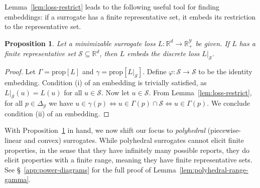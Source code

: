 \documentclass[11pt]{article}
\newcommand{\reals}{\mathbb{R}}
\newcommand{\prop}[1]{\mathrm{prop}[#1]}
\newcommand{\simplex}{\Delta_\Y}
\newcommand{\Sc}{\mathcal{S}}
\newcommand{\Y}{\mathcal{Y}}
\newtheorem{proposition}{Proposition}
\begin{document}
Lemma~\ref{lem:loss-restrict} leads to the following useful tool for finding embeddings: if a surrogate has a finite representative set, it embeds its restriction to the representative set.
\begin{proposition}\label{prop:representative-embeds-restriction}
  Let a minimizable surrogate loss $L:\reals^d \to \reals^\Y_+$ be given.
  If $L$ has a finite representative set $\Sc \subseteq \reals^d$, then $L$ embeds the discrete loss $L|_\Sc$.
\end{proposition}
\begin{proof}
  Let $\Gamma = \prop{L}$ and $\gamma = \prop{L|_\Sc}$.
  Define $\varphi : \Sc \to \Sc$ to be the identity embedding.
  Condition (i) of an embedding is trivially satisfied, as $L|_\Sc(u) = L(u)$ for all $u\in\Sc$.
  Now let $u\in\Sc$.
  From Lemma~\ref{lem:loss-restrict}, for all $p\in\simplex$ we have $u \in \gamma(p) \iff u \in \Gamma(p) \cap \Sc \iff u \in \Gamma(p)$.
  We conclude condition (ii) of an embedding.
\end{proof}


With Proposition~\ref{prop:representative-embeds-restriction} in hand, we now shift our focus to \emph{polyhedral} (piecewise-linear and convex) surrogates.
While polyhedral surrogates cannot elicit finite properties, in the sense that they have infinitely many possible reports, they do elicit properties with a finite range, meaning they have finite representative sets.
See \S~\ref{app:power-diagrams} for the full proof of Lemma~\ref{lem:polyhedral-range-gamma}.
\end{document}
